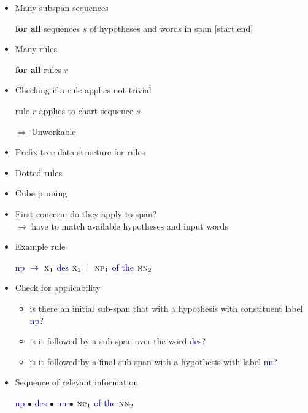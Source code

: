 \documentclass[landscape]{slides}
\newcommand{\example}[1]{\textcolor{darkblue}{\rm #1}}
\begin{document}
\begin{itemize}
\item Many subspan sequences
\begin{center}
{\bf for all} sequences $s$ of hypotheses and words in span [start,end]
\end{center}
\item Many rules
\begin{center}
{\bf for all} {rules $r$}
\end{center}
\item Checking if a rule applies not trivial
\begin{center}
rule $r$ applies to chart sequence $s$
\end{center}
\item[$\Rightarrow$] Unworkable
\end{itemize}


\vspace{30mm}
\begin{itemize}\itemsep 10mm
\item Prefix tree data structure for rules
\item Dotted rules
\item Cube pruning
\end{itemize}


\begin{itemize}
\item First concern: do they apply to span?\\
$\rightarrow$ have to match available hypotheses and input words
\item Example rule
\begin{center}
\example{{\sc np} $\rightarrow$ 
$\text{\sc x}_1$ des $\text{\sc x}_2$ $\;|\;$
$\text{\sc np}_1$ of the $\text{\sc nn}_2$}
\end{center}
\item Check for applicability
\begin{itemize}
\item is there an initial sub-span that with a hypothesis with constituent label \example{\sc np}?
\item is it followed by a sub-span over the word \example{des}?
\item is it followed by a final sub-span with a hypothesis with  label \example{\sc nn}?
\end{itemize}
\item Sequence of relevant information
\begin{center}
\example{\sc np} $\bullet$ \example{des}  $\bullet$ \example{\sc nn}  $\bullet$ \example{$\text{\sc np}_1$ of the $\text{\sc nn}_2$}
\end{center}
\end{itemize}
\end{document}

